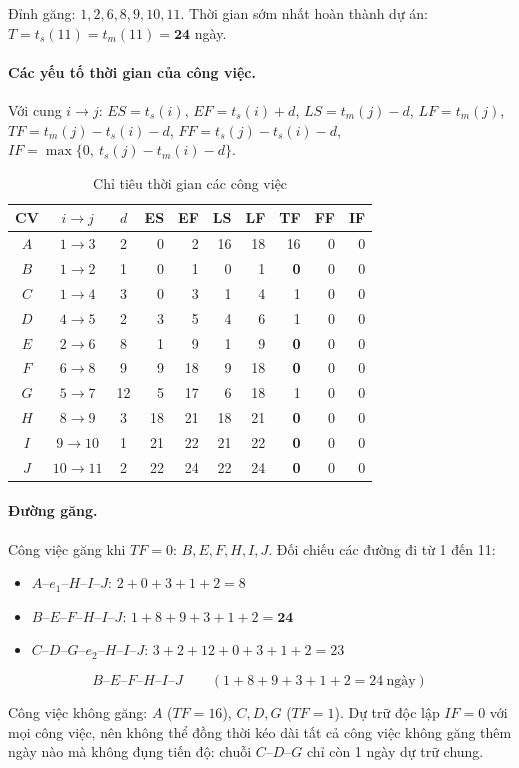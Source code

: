 \documentclass[12pt,a4paper]{article}
\begin{document}
Đỉnh găng: $1,2,6,8,9,10,11$.
Thời gian sớm nhất hoàn thành dự án: $T=t_s(11)=t_m(11)=\mathbf{24}$ ngày.

\paragraph{Các yếu tố thời gian của công việc.}
Với cung $i\rightarrow j$:
$ES=t_s(i)$, $EF=t_s(i)+d$, $LS=t_m(j)-d$, $LF=t_m(j)$,
$TF=t_m(j)-t_s(i)-d$,
$FF=t_s(j)-t_s(i)-d$,
$IF=\max\{0,\ t_s(j)-t_m(i)-d\}$.

\begin{table}[H]\centering
\caption{Chỉ tiêu thời gian các công việc}
\small
\begin{tabular}{c|c|c|rr|rr|rrr}
\toprule
\textbf{CV} & $i\!\rightarrow\!j$ & $d$ & ES & EF & LS & LF & TF & FF & IF\\
\midrule
$A$ & $1\rightarrow 3$ & 2 & 0 & 2 & 16 & 18 & 16 & 0 & 0\\
$B$ & $1\rightarrow 2$ & 1 & 0 & 1 & 0 & 1 & \textbf{0} & 0 & 0\\
$C$ & $1\rightarrow 4$ & 3 & 0 & 3 & 1 & 4 & 1 & 0 & 0\\
$D$ & $4\rightarrow 5$ & 2 & 3 & 5 & 4 & 6 & 1 & 0 & 0\\
$E$ & $2\rightarrow 6$ & 8 & 1 & 9 & 1 & 9 & \textbf{0} & 0 & 0\\
$F$ & $6\rightarrow 8$ & 9 & 9 & 18 & 9 & 18 & \textbf{0} & 0 & 0\\
$G$ & $5\rightarrow 7$ & 12 & 5 & 17 & 6 & 18 & 1 & 0 & 0\\
$H$ & $8\rightarrow 9$ & 3 & 18 & 21 & 18 & 21 & \textbf{0} & 0 & 0\\
$I$ & $9\rightarrow 10$ & 1 & 21 & 22 & 21 & 22 & \textbf{0} & 0 & 0\\
$J$ & $10\rightarrow 11$ & 2 & 22 & 24 & 22 & 24 & \textbf{0} & 0 & 0\\
\bottomrule
\end{tabular}
\end{table}

\paragraph{Đường găng.}
Công việc găng khi $TF=0$: $B,E,F,H,I,J$.
Đối chiếu các đường đi từ 1 đến 11:
\begin{itemize}
  \itemsep=1pt
  \item $A$--$e_1$--$H$--$I$--$J$: $2+0+3+1+2=8$
  \item $B$--$E$--$F$--$H$--$I$--$J$: $1+8+9+3+1+2=\mathbf{24}$
  \item $C$--$D$--$G$--$e_2$--$H$--$I$--$J$: $3+2+12+0+3+1+2=23$
\end{itemize}
\[
  \boxed{B\text{--}E\text{--}F\text{--}H\text{--}I\text{--}J\qquad (1+8+9+3+1+2=24\ \text{ngày})}
\]

Công việc không găng: $A$ ($TF=16$), $C,D,G$ ($TF=1$).
Dự trữ độc lập $IF=0$ với mọi công việc, nên không thể đồng thời kéo dài tất cả công việc không găng thêm ngày nào mà không đụng tiến độ: chuỗi $C$--$D$--$G$ chỉ còn 1 ngày dự trữ chung.
\end{document}
